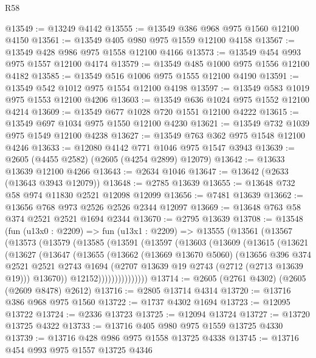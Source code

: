\begin{lexlean}{R58}
\begin{coremodule}
@13549 := @13249 @4142
@13555 := @13549 @386 @968 @975 @1560 @12100 @4150
@13561 := @13549 @405 @980 @975 @1559 @12100 @4158
@13567 := @13549 @428 @986 @975 @1558 @12100 @4166
@13573 := @13549 @454 @993 @975 @1557 @12100 @4174
@13579 := @13549 @485 @1000 @975 @1556 @12100 @4182
@13585 := @13549 @516 @1006 @975 @1555 @12100 @4190
@13591 := @13549 @542 @1012 @975 @1554 @12100 @4198
@13597 := @13549 @583 @1019 @975 @1553 @12100 @4206
@13603 := @13549 @636 @1024 @975 @1552 @12100 @4214
@13609 := @13549 @677 @1028 @720 @1551 @12100 @4222
@13615 := @13549 @697 @1034 @975 @1550 @12100 @4230
@13621 := @13549 @732 @1039 @975 @1549 @12100 @4238
@13627 := @13549 @763 @362 @975 @1548 @12100 @4246
@13633 := @12080 @4142 @771 @1046 @975 @1547 @3943
@13639 := @2605 (@4455 @2582) (@2605 (@4254 @2899) @12079)
@13642 := @13633 @13639 @12100 @4266
@13643 := @2634 @1046
@13647 := @13642 (@2633 (@13643 @3943 @12079))
@13648 := @2785 @13639
@13655 := @13648 @732 @58 @974 @11830 @2521 @12098 @12099
@13656 := @7481 @13639
@13662 := @13656 @768 @973 @2526 @2526 @2344 @12097
@13669 := @13648 @763 @58 @374 @2521 @2521 @1694 @2344
@13670 := @2795 @13639
@13708 := @13548
    (fun (u13x0 : @2209) =>
    fun (u13x1 : @2209) =>
    @13555
      (@13561
        (@13567
          (@13573
            (@13579
              (@13585
                (@13591
                  (@13597
                    (@13603
                      (@13609
                        (@13615
                          (@13621
                            (@13627
                              (@13647
                                (@13655
                                  (@13662
                                    (@13669 @13670 @5060)
                                    (@13656
                                      @396
                                      @374
                                      @2521
                                      @2521
                                      @2743
                                      @1694
                                      (@2707 @13639 @19 @2743 (@2712 (@2713 @13639 @19)))
                                      @13670))
                                  @12152)))))))))))))))
@13714 := @2605 (@2761 @4302) (@2605 (@2609 @8478) @2612)
@13716 := @2805 @13714 @4314
@13720 := @13716 @386 @968 @975 @1560
@13722 := @1737 @4302 @1694
@13723 := @12095 @13722
@13724 := @2336 @13723
@13725 := @12094 @13724
@13727 := @13720 @13725 @4322
@13733 := @13716 @405 @980 @975 @1559 @13725 @4330
@13739 := @13716 @428 @986 @975 @1558 @13725 @4338
@13745 := @13716 @454 @993 @975 @1557 @13725 @4346

\end{coremodule}
\end{lexlean}
